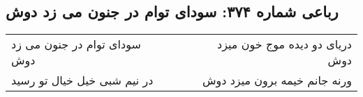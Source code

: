 \begin{center}
\section*{رباعی شماره ۳۷۴: سودای توام در جنون می زد دوش}
\label{sec:sh374}
\begin{longtable}{l p{0.5cm} r}
سودای توام در جنون می زد دوش
&&
دریای دو دیده موج خون میزد دوش
\\
در نیم شبی خیل خیال تو رسید
&&
ورنه جانم خیمه برون میزد دوش
\\
\end{longtable}
\end{center}
